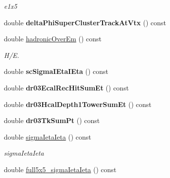 \begin{DoxyCompactItemize}
\begin{DoxyCompactList}\small\item\em e1x5 \end{DoxyCompactList}\item 
\hypertarget{classran_1_1NtElectron_a7ee65cf4cdf115cbafba25f901dad0ff}{double {\bfseries delta\-Phi\-Super\-Cluster\-Track\-At\-Vtx} () const }\label{classran_1_1NtElectron_a7ee65cf4cdf115cbafba25f901dad0ff}

\item 
\hypertarget{classran_1_1NtElectron_a89fb13136b948d50e34f8430c060241a}{double \hyperlink{classran_1_1NtElectron_a89fb13136b948d50e34f8430c060241a}{hadronic\-Over\-Em} () const }\label{classran_1_1NtElectron_a89fb13136b948d50e34f8430c060241a}

\begin{DoxyCompactList}\small\item\em H/\-E. \end{DoxyCompactList}\item 
\hypertarget{classran_1_1NtElectron_a056954295bfc2e8ed4f42d417e4a2a47}{double {\bfseries sc\-Sigma\-I\-Eta\-I\-Eta} () const }\label{classran_1_1NtElectron_a056954295bfc2e8ed4f42d417e4a2a47}

\item 
\hypertarget{classran_1_1NtElectron_adf42db8afac88f64cc158c321ebe7001}{double {\bfseries dr03\-Ecal\-Rec\-Hit\-Sum\-Et} () const }\label{classran_1_1NtElectron_adf42db8afac88f64cc158c321ebe7001}

\item 
\hypertarget{classran_1_1NtElectron_a9c5a0f9beb630fdd9ba0bd283e51e267}{double {\bfseries dr03\-Hcal\-Depth1\-Tower\-Sum\-Et} () const }\label{classran_1_1NtElectron_a9c5a0f9beb630fdd9ba0bd283e51e267}

\item 
\hypertarget{classran_1_1NtElectron_a17fef20cad5536dd731fbd18118e0b6c}{double {\bfseries dr03\-Tk\-Sum\-Pt} () const }\label{classran_1_1NtElectron_a17fef20cad5536dd731fbd18118e0b6c}

\item 
\hypertarget{classran_1_1NtElectron_a7f2fa48a46960372c6db4ae71cee6c03}{double \hyperlink{classran_1_1NtElectron_a7f2fa48a46960372c6db4ae71cee6c03}{sigma\-Ieta\-Ieta} () const }\label{classran_1_1NtElectron_a7f2fa48a46960372c6db4ae71cee6c03}

\begin{DoxyCompactList}\small\item\em sigma\-Ieta\-Ieta \end{DoxyCompactList}\item 
\hypertarget{classran_1_1NtElectron_a7a4a2732c47bc01638a0e509a2d5e7c9}{double \hyperlink{classran_1_1NtElectron_a7a4a2732c47bc01638a0e509a2d5e7c9}{full5x5\-\_\-sigma\-Ieta\-Ieta} () const }\label{classran_1_1NtElectron_a7a4a2732c47bc01638a0e509a2d5e7c9}


\end{DoxyCompactItemize}
